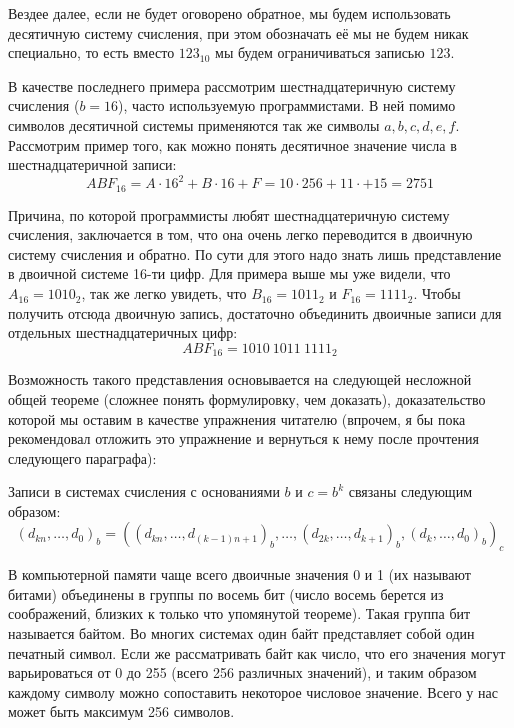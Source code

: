 Вездее далее, если не будет оговорено обратное, мы будем использовать десятичную систему счисления, при этом обозначать её мы не будем никак специально, то есть вместо $123_{10}$ мы будем ограничиваться записью $123$.

В качестве последнего примера рассмотрим шестнадцатеричную систему счисления ($b=16$), часто используемую программистами. В ней помимо символов десятичной системы применяются так же символы $a, b, c, d, e, f$. Рассмотрим пример того, как можно понять десятичное значение числа в шестнадцатеричной записи:
$$ABF_{16} = A\cdot 16^2 + B\cdot 16 + F = 10\cdot 256 + 11 \cdot + 15 = 2751$$

Причина, по которой программисты любят шестнадцатеричную систему счисления, заключается в том, что она очень легко переводится в двоичную систему счисления и обратно. По сути для этого надо знать лишь представление в двоичной системе 16-ти цифр. Для примера выше мы уже видели, что $A_{16} = 1010_2$, так же легко увидеть, что $B_{16} = 1011_2$ и $F_{16} = 1111_2$. Чтобы получить отсюда двоичную запись, достаточно объединить двоичные записи для отдельных шестнадцатеричных цифр: $$ABF_{16} = 1010\:1011\:1111_2$$

Возможность такого представления основывается на следующей несложной общей теореме (сложнее понять формулировку, чем доказать), доказательство которой мы оставим в качестве упражнения читателю (впрочем, я бы пока рекомендовал отложить это упражнение и вернуться к нему после прочтения следующего параграфа):
\begin{thm}
Записи в системах счисления с основаниями $b$ и $c = b^k$ связаны следующим образом: $$(d_{kn},\dots, d_0)_b = ((d_{kn}, \ldots, d_{(k-1)n + 1})_b, \dots, (d_{2k}, \dots, d_{k+1})_b , (d_k, \dots, d_0)_b)_c$$
\end{thm}

В компьютерной памяти чаще всего двоичные значения 0 и 1 (их называют битами) объединены в группы по восемь бит (число восемь берется из соображений, близких к только что упомянутой теореме). Такая группа бит называется байтом. Во многих системах один байт представляет собой один печатный символ. Если же рассматривать байт как число, что его значения могут варьироваться от 0 до 255 (всего 256 различных значений), и таким образом каждому символу можно сопоставить некоторое числовое значение. Всего у нас может быть максимум 256 символов.

